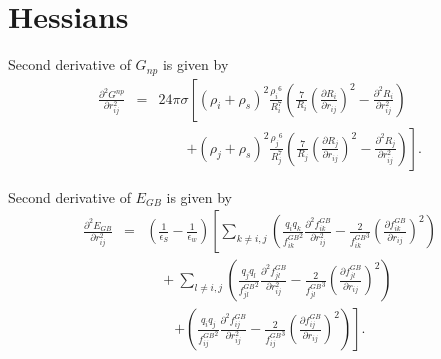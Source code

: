\documentclass[12pt]{article}
\begin{document}
\section{Hessians}
Second derivative of $G_{np}$ is given by
\begin{eqnarray}
\label{eq:GnpHess1}
\frac{\partial^{2} G^{np}}{\partial r_{ij}^{2}} &=& 24{\pi}{\sigma}\left[ ({\rho}_{i} + {\rho}_{s})^{2}\frac{{\rho_{i}}^{6}}{R_{i}^{7}}
\left(\frac{7}{R_{i}}\left(\frac{\partial R_{i}}{\partial r_{ij}}\right)^{2} - \frac{\partial^{2}R_{i}}{\partial r_{ij}^{2}}\right) \right. \nonumber \\
&& \qquad \left.+ ({\rho}_{j} + {\rho}_{s})^{2}
\frac{{\rho_{j}}^{6}}{R_{j}^{7}} \left(\frac{7}{R_{j}}\left(\frac{\partial R_{j}}{\partial r_{ij}}\right)^{2} -  \frac{\partial^{2}R_{j}}{\partial r_{ij}^{2}}\right) \right]. 
\end{eqnarray}

Second derivative of $E_{GB}$ is given by
\begin{eqnarray}
\frac{\partial^{2} E_{GB}}{\partial r_{ij}^{2}} &=&  \left(\frac{1}{{\epsilon}_{S}} - \frac{1}{{\epsilon}_{w}}\right)
\left[ 
\displaystyle\sum_{k\ne i,j} \left(\frac{q_{i}q_{k}}{{f_{ik}^{GB}}^{2}}\frac{\partial^{2}f_{ik}^{GB}}{\partial r_{ij}^{2}} - \frac{2}{{f_{ik}^{GB}}^{3}}\left(\frac{\partial f_{ik}^{GB}}{\partial r_{ij}}\right)^{2}\right)\right. \nonumber \\
&& \quad + \displaystyle\sum_{l\ne i,j} \left(\frac{q_{j}q_{l}}{{f_{jl}^{GB}}^{2}}\frac{\partial^{2}f_{jl}^{GB}}{\partial r_{ij}^{2}} - \frac{2}{{f_{jl}^{GB}}^{3}}\left(\frac{\partial f_{jl}^{GB}}{\partial r_{ij}}\right)^{2}\right) \nonumber \\
&& \qquad \left. +\left(\frac{q_{i}q_{j}}{{f_{ij}^{GB}}^{2}}\frac{\partial^{2}f_{ij}^{GB}}{\partial r_{ij}^{2}} - \frac{2}{{f_{ij}^{GB}}^{3}}\left(\frac{\partial f_{ij}^{GB}}{\partial r_{ij}}\right)^{2} \right) 
\right].
\end{eqnarray}
\end{document}

